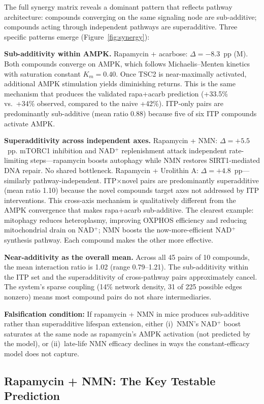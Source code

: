 \documentclass[11pt]{article}
\begin{document}
The full synergy matrix reveals a dominant pattern that reflects pathway architecture: compounds converging on the same signaling node are sub-additive; compounds acting through independent pathways are superadditive. Three specific patterns emerge (Figure~\ref{fig:synergy}):

\textbf{Sub-additivity within AMPK.} Rapamycin + acarbose: $\Delta = -8.3$~pp (M). Both compounds converge on AMPK, which follows Michaelis--Menten kinetics with saturation constant $K_m = 0.40$. Once TSC2 is near-maximally activated, additional AMPK stimulation yields diminishing returns. This is the same mechanism that produces the validated rapa+acarb prediction (+33.5\% vs.\ +34\% observed, compared to the naive +42\%). ITP-only pairs are predominantly sub-additive (mean ratio 0.88) because five of six ITP compounds activate AMPK.

\textbf{Superadditivity across independent axes.} Rapamycin + NMN: $\Delta = +5.5$~pp. mTORC1 inhibition and NAD$^+$ replenishment attack independent rate-limiting steps---rapamycin boosts autophagy while NMN restores SIRT1-mediated DNA repair. No shared bottleneck. Rapamycin + Urolithin A: $\Delta = +4.8$~pp---similarly pathway-independent. ITP$\times$novel pairs are predominantly superadditive (mean ratio 1.10) because the novel compounds target axes not addressed by ITP interventions. This cross-axis mechanism is qualitatively different from the AMPK convergence that makes rapa+acarb sub-additive. The clearest example: mitophagy reduces heteroplasmy, improving OXPHOS efficiency and reducing mitochondrial drain on NAD$^+$; NMN boosts the now-more-efficient NAD$^+$ synthesis pathway. Each compound makes the other more effective.

\textbf{Near-additivity as the overall mean.} Across all 45 pairs of 10 compounds, the mean interaction ratio is 1.02 (range 0.79--1.21). The sub-additivity within the ITP set and the superadditivity of cross-pathway pairs approximately cancel. The system's sparse coupling (14\% network density, 31 of 225 possible edges nonzero) means most compound pairs do not share intermediaries.

\textbf{Falsification condition:} If rapamycin + NMN in mice produces sub-additive rather than superadditive lifespan extension, either (i)~NMN's NAD$^+$ boost saturates at the same node as rapamycin's AMPK activation (not predicted by the model), or (ii)~late-life NMN efficacy declines in ways the constant-efficacy model does not capture.

\subsection{Rapamycin + NMN: The Key Testable Prediction}
\end{document}
